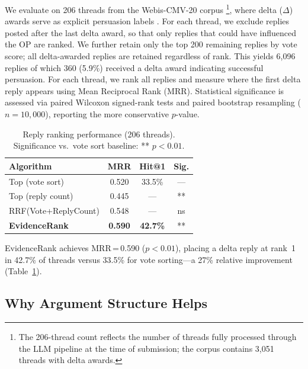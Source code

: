 We evaluate on 206 threads from the Webis-CMV-20 corpus \citep{Kolyada2020}\footnote{The 206-thread count reflects the number of threads fully processed through the LLM pipeline at the time of submission; the corpus contains 3{,}051 threads with delta awards.}, where delta ($\Delta$) awards serve as explicit persuasion labels \citep{tan-etal-2016-winning}. For each thread, we exclude replies posted after the last delta award, so that only replies that could have influenced the OP are ranked. We further retain only the top 200 remaining replies by vote score; all delta-awarded replies are retained regardless of rank. This yields 6{,}096 replies of which 360 (5.9\%) received a delta award indicating successful persuasion. For each thread, we rank all replies and measure where the first delta reply appears using Mean Reciprocal Rank (MRR). Statistical significance is assessed via paired Wilcoxon signed-rank tests and paired bootstrap resampling ($n=10{,}000$), reporting the more conservative $p$-value.

\begin{table}[t]
\centering
\small
\begin{tabular}{lccc}
\toprule
\textbf{Algorithm} & \textbf{MRR} & \textbf{Hit@1} & \textbf{Sig.} \\
\midrule
Top (vote sort)          & 0.520 & 33.5\% & ---  \\
Top (reply count)        & 0.445 & ---    & **   \\
RRF(Vote+ReplyCount)     & 0.548 & ---    & ns   \\
\textbf{EvidenceRank}    & \textbf{0.590} & \textbf{42.7\%} & **   \\
\bottomrule
\end{tabular}
\caption{Reply ranking performance (206 threads). Significance vs.\ vote sort baseline: ** $p<0.01$.}
\label{tab:results}
\end{table}

EvidenceRank achieves MRR\,=\,0.590 ($p < 0.01$), placing a delta reply at rank~1 in 42.7\% of threads versus 33.5\% for vote sorting---a 27\% relative improvement (Table~\ref{tab:results}).

\subsection{Why Argument Structure Helps}

